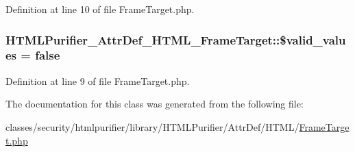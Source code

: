 Definition at line 10 of file Frame\+Target.\+php.

\hypertarget{classHTMLPurifier__AttrDef__HTML__FrameTarget_aa182df884f684070451afdcd407d1ef1}{
\subsubsection[{\$valid\+\_\+values}]{\setlength{\rightskip}{0pt plus 5cm}H\+T\+M\+L\+Purifier\+\_\+\+Attr\+Def\+\_\+\+H\+T\+M\+L\+\_\+\+Frame\+Target\+::\$valid\+\_\+values = false}}\label{classHTMLPurifier__AttrDef__HTML__FrameTarget_aa182df884f684070451afdcd407d1ef1}


Definition at line 9 of file Frame\+Target.\+php.



The documentation for this class was generated from the following file\+:\begin{DoxyCompactItemize}
\item 
classes/security/htmlpurifier/library/\+H\+T\+M\+L\+Purifier/\+Attr\+Def/\+H\+T\+M\+L/\hyperlink{FrameTarget_8php}{Frame\+Target.\+php}\end{DoxyCompactItemize}
